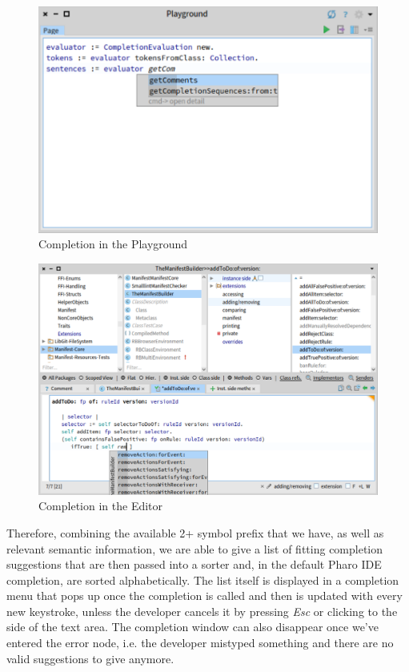 \begin{figure}[H]
    \centering
    \includegraphics[width=0.9\linewidth]{images/completion1.png}
    \caption{Completion in the Playground}
    \label{fig:playground}
\end{figure}

\begin{figure}[H]
    \centering
    \includegraphics[width=0.9\linewidth]{images/completion2.png}
    \caption{Completion in the Editor}
    \label{fig:editor}
\end{figure}

Therefore, combining the available 2+ symbol prefix that we have, as well as relevant semantic information, we are able to give a list of fitting completion suggestions that are then passed into a sorter and, in the default Pharo IDE completion, are sorted alphabetically. The list itself is displayed in a completion menu that pops up once the completion is called and then is updated with every new keystroke, unless the developer cancels it by pressing \textit{Esc} or clicking to the side of the text area. The completion window can also disappear once we've entered the error node, i.e. the developer mistyped something and there are no valid suggestions to give anymore.

